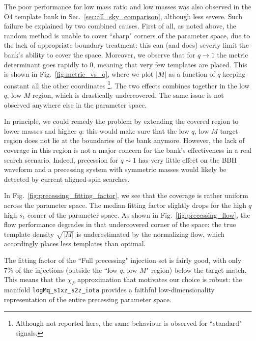 \documentclass[twocolumn,showpacs,preprintnumbers,nofootinbib,prd,
superscriptaddress,10pt]{revtex4-2}
\begin{document}
The poor performance for low mass ratio and low masses was also observed in the O4 template bank in Sec.~\ref{sec:all_sky_comparison}, although less severe.
Such failure be explained by two combined causes.
First of all, as noted above, the random method is unable to cover ``sharp" corners of the parameter space, due to the lack of appropriate boundary treatment: this can (and does) severly limit the bank's ability to cover the space.
Moreover, we observe that for $q \to 1$ the metric determinant goes rapidly to $0$, meaning that very few templates are placed.  This is shown in Fig.~\ref{fig:metric_vs_q}, where we plot $|M|$ as a function of $q$ keeping constant all the other coordinates \footnote{Although not reported here, the same behaviour is observed for ``standard" signals.}.
The two effects combines together in the low $q$, low $M$ region, which is drastically undercovered. The same issue is not observed anywhere else in the parameter space.

In principle, we could remedy the problem by extending the covered region to lower masses and higher $q$: this would make sure that the low $q$, low $M$ target region does not lie at the boundaries of the bank anymore.
However, the lack of coverage in this region is not a major concern for the bank's effectiveness in a real search scenario. Indeed, precession for $q\sim 1$ has very little effect on the BBH waveform and a precessing system with symmetric masses would likely be detected by current aligned-spin searches.

In Fig.~\ref{fig:precessing_fitting_factor}, we see that the coverage is rather uniform across the parameter space. The median fitting factor slightly drops for the high $q$ high $s_1$ corner of the parameter space.
As shown in Fig.~\ref{fig:precessing_flow}, the flow performance degrades in that undercovered corner of the space: the true template density $\sqrt{|M|}$ is underestimated by the normalizing flow, which accordingly places less templates than optimal.

The fitting factor of the ``Full precessing" injection set is fairly good, with only $7\%$ of the injections (outside the ``low $q$, low $M$" region) below the target match. This means that the $\chi_P$ approximation that motivates our choice is robust: the manifold \texttt{logMq\_s1xz\_s2z\_iota} provides a faithful low-dimensionality representation of the entire precessing parameter space.
\end{document}
